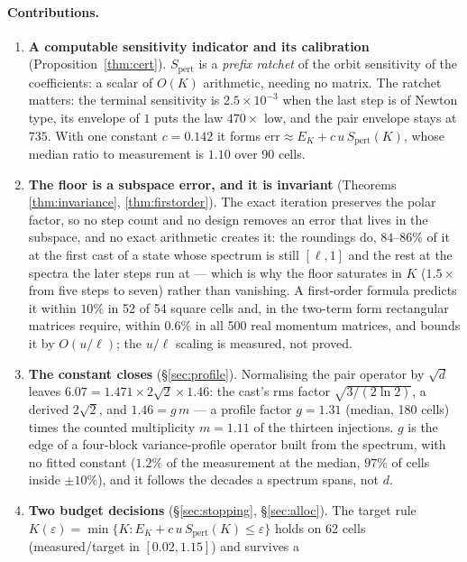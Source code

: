 \paragraph{Contributions.}
\begin{enumerate}
\item \textbf{A computable sensitivity indicator and its calibration}
(Proposition~\ref{thm:cert}).  $S_{\mathrm{pert}}$ is a \emph{prefix ratchet} of the
orbit sensitivity of the coefficients: a scalar of $O(K)$ arithmetic, needing no
matrix.  The ratchet matters: the terminal sensitivity is $2.5\times10^{-3}$ when the last
step is of Newton type, its envelope of $1$ puts the law $470\times$ low, and the pair
envelope stays at $735$.  With one constant
$c=0.142$ it forms $\mathrm{err} \approx E_K + c\,u\,S_{\mathrm{pert}}(K)$, whose median
ratio to measurement is $1.10$ over 90 cells.
\item \textbf{The floor is a subspace error, and it is invariant} (Theorems
\ref{thm:invariance}, \ref{thm:firstorder}).  The exact iteration preserves the polar
factor, so no step count and no design removes an error that lives in the subspace, and no
exact arithmetic creates it: the roundings do, $84$--$86\%$ of it at the first cast of a
state whose spectrum is still $[\ell,1]$ and the rest at the spectra the later steps run at
--- which is why the floor saturates in $K$ ($1.5\times$ from five steps to seven) rather
than vanishing.  A
first-order formula predicts it within $10\%$ in 52 of 54 square cells and, in the
two-term form rectangular matrices require, within $0.6\%$ in all 500 real momentum
matrices, and bounds it by $O(u/\ell)$; the $u/\ell$ scaling is measured, not proved.
\item \textbf{The constant closes} (\S\ref{sec:profile}).  Normalising the pair operator
by $\sqrt d$ leaves $6.07=1.471\times2\sqrt2\times1.46$: the cast's rms factor
$\sqrt{3/(2\ln2)}$, a derived $2\sqrt2$, and $1.46=g\,m$ --- a profile factor $g=1.31$
(median, 180 cells) times the counted multiplicity $m=1.11$ of the thirteen injections.
$g$ is the edge of a four-block
variance-profile operator built from the spectrum, with no fitted constant ($1.2\%$ of the
measurement at the median, $97\%$ of cells inside $\pm10\%$), and it follows the decades a
spectrum spans, not $d$.
\item \textbf{Two budget decisions} (\S\ref{sec:stopping}, \S\ref{sec:alloc}).  The
target rule $K(\varepsilon) = \min\{K : E_K + c\,u\,S_{\mathrm{pert}}(K) \le
\varepsilon\}$ holds on 62 cells (measured/target in $[0.02,1.15]$) and survives a

\end{enumerate}
